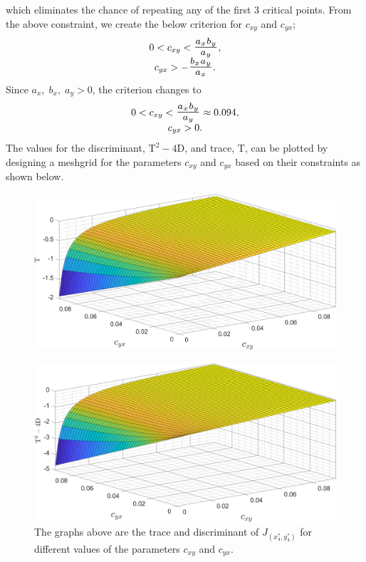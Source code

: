 which eliminates the chance of repeating any of the first 3 critical points.
From the above constraint, we create the below criterion for $c_{xy}$ and $c_{yx}$;
\begin{equation*}
\begin{array}{c}
     0<c_{xy} < \scalebox{1.3}{$\frac{a_xb_y}{a_y}$}, \\[.1cm]
     c_{yx} > -\scalebox{1.3}{$\frac{b_xa_y}{a_x}$}.
\end{array}
\end{equation*}
Since $a_x,\;b_x,\;a_y>0$, the criterion changes to
\begin{equation*}
\begin{array}{c}
     0<c_{xy} < \scalebox{1.3}{$\frac{a_xb_y}{a_y}$} \approx 0.094, \\
     c_{yx} > 0.
\end{array}
\end{equation*}
The values for the discriminant, $\mathrm{T}^2-4\mathrm{D}$, and trace, $\mathrm{T}$, can be plotted by designing a meshgrid for the parameters $c_{xy}$ and $c_{yx}$ based on their constraints as shown below.
\begin{figure}[H]
    \centering
    \includegraphics[width=14cm]{Pictures/Stability/Trace.png}
\end{figure}
\begin{figure}[H]
    \centering
    \includegraphics[width=14cm]{Pictures/Stability/Discriminant.png}
    \caption{\singlespacing
    The graphs above are the trace and discriminant of $\displaystyle J_{(x^*_4,y^*_4)}$ for different values of the parameters $c_{xy}$ and $c_{yx}$.}
    \label{fig:TraceDiscriminant}
\end{figure}
